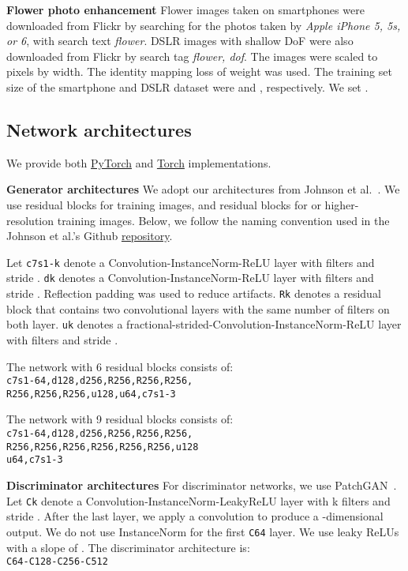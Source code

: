 \documentclass[10pt,twocolumn,letterpaper]{article}
\newcommand{\shortcite}[1]{\cite{#1}}
\begin{document}
{\bf Flower photo enhancement} Flower images taken on smartphones were downloaded from Flickr by searching for the photos taken by 
\textit{Apple iPhone 5, 5s, or 6}, with search text \textit{flower}. DSLR images with shallow DoF were also downloaded from Flickr by search tag \textit{flower, dof}. The images were scaled to  pixels by width. The identity mapping loss of weight  was used. The training set size of the smartphone and DSLR dataset were  and , respectively. We set .


\subsection{Network architectures}
We provide both \href{https://github.com/junyanz/pytorch-CycleGAN-and-pix2pix}{PyTorch} and \href{https://github.com/junyanz/CycleGAN}{Torch} implementations. 

{\bf Generator architectures}
We adopt our architectures from Johnson et al.~\shortcite{johnson2016perceptual}. We use  residual blocks for  training images, and  residual blocks for  or higher-resolution training images. Below, we follow the naming convention used in the Johnson et al.'s Github \href{https://github.com/jcjohnson/fast-neural-style}{repository}.

Let \texttt{c7s1-k} denote a  Convolution-InstanceNorm-ReLU layer with  filters and stride . \texttt{dk} denotes a  Convolution-InstanceNorm-ReLU layer with  filters and stride . Reflection padding was used to reduce artifacts. \texttt{Rk} denotes a residual block that contains two  convolutional layers with the same number of filters on both layer. \texttt{uk} denotes a  fractional-strided-Convolution-InstanceNorm-ReLU layer with  filters and stride . 


The network with 6 residual blocks consists of:\\
\texttt{c7s1-64,d128,d256,R256,R256,R256,\\
R256,R256,R256,u128,u64,c7s1-3}

The network with 9 residual blocks consists of:\\
\texttt{c7s1-64,d128,d256,R256,R256,R256,\\
R256,R256,R256,R256,R256,R256,u128} \\
\texttt{u64,c7s1-3}


{\bf Discriminator architectures}
For discriminator networks, we use  PatchGAN~\cite{isola2016image}. 
Let \texttt{Ck} denote a  Convolution-InstanceNorm-LeakyReLU layer with k filters and stride . After the last layer, we apply a convolution to produce a -dimensional output. We do not use InstanceNorm for the first \texttt{C64} layer. We use leaky ReLUs with a slope of . The discriminator architecture is:\\
\texttt{C64-C128-C256-C512}
 
\end{document}
